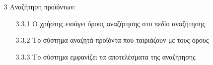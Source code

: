 \documentclass[12pt,a4paper,twoside]{book}
\begin{document}
\begin{enumerate}
  \item[3 ] Αναζήτηση προϊόντων:
        \begin{enumerate}
          \item [3.3.1 ] Ο χρήστης εισάγει όρους αναζήτησης στο πεδίο αναζήτησης %
          \item [3.3.2 ] Το σύστημα αναζητά προϊόντα που ταιριάζουν με τους όρους
          \item [3.3.3 ] Το σύστημα εμφανίζει τα αποτελέσματα της αναζήτησης
        \end{enumerate}
\end{enumerate}
\end{document}
